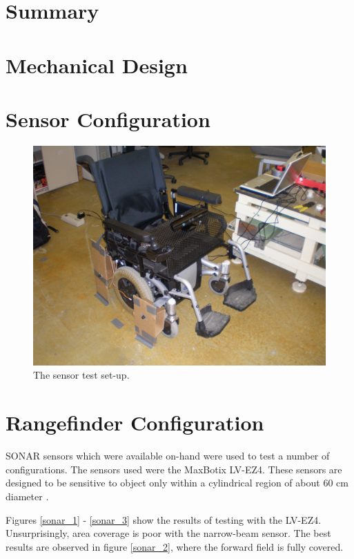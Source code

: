 \documentclass[oneside,final]{report}
\begin{document}
\section{Summary}

\section{Mechanical Design}

\section{Sensor Configuration}
\begin{figure}[hbt]
 \centering
 \includegraphics[scale=0.1]{testing.jpg}
 \caption{The sensor test set-up.}
\end{figure}

\section{Rangefinder Configuration}
SONAR sensors which were available on-hand were used to test a number of configurations.  The sensors used were the MaxBotix LV-EZ4.  These sensors are designed to be sensitive to object only within a cylindrical region of about 60 cm diameter \cite{lv-ez4}.  

Figures \ref{sonar_1} - \ref{sonar_3} show the results of testing with the LV-EZ4.  Unsurprisingly, area coverage is poor with the narrow-beam sensor.  The best results are observed in figure \ref{sonar_2}, where the forward field is fully covered.
\end{document}
